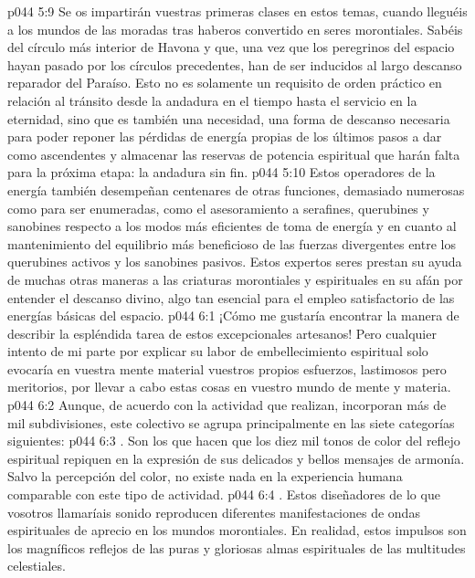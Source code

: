 \vs p044 5:9 Se os impartirán vuestras primeras clases en estos temas, cuando lleguéis a los mundos de las moradas tras haberos convertido en seres morontiales. Sabéis del círculo más interior de Havona y que, una vez que los peregrinos del espacio hayan pasado por los círculos precedentes, han de ser inducidos al largo descanso reparador del Paraíso. Esto no es solamente un requisito de orden práctico en relación al tránsito desde la andadura en el tiempo hasta el servicio en la eternidad, sino que es también una necesidad, una forma de descanso necesaria para poder reponer las pérdidas de energía propias de los últimos pasos a dar como ascendentes y almacenar las reservas de potencia espiritual que harán falta para la próxima etapa: la andadura sin fin.
\vs p044 5:10 Estos operadores de la energía también desempeñan centenares de otras funciones, demasiado numerosas como para ser enumeradas, como el asesoramiento a serafines, querubines y sanobines respecto a los modos más eficientes de toma de energía y en cuanto al mantenimiento del equilibrio más beneficioso de las fuerzas divergentes entre los querubines activos y los sanobines pasivos. Estos expertos seres prestan su ayuda de muchas otras maneras a las criaturas morontiales y espirituales en su afán por entender el descanso divino, algo tan esencial para el empleo satisfactorio de las energías básicas del espacio.
\vs p044 6:1 ¡Cómo me gustaría encontrar la manera de describir la espléndida tarea de estos excepcionales artesanos! Pero cualquier intento de mi parte por explicar su labor de embellecimiento espiritual solo evocaría en vuestra mente material vuestros propios esfuerzos, lastimosos pero meritorios, por llevar a cabo estas cosas en vuestro mundo de mente y materia.
\vs p044 6:2 Aunque, de acuerdo con la actividad que realizan, incorporan más de mil subdivisiones, este colectivo se agrupa principalmente en las siete categorías siguientes:
\vs p044 6:3 . Son los que hacen que los diez mil tonos de color del reflejo espiritual repiquen en la expresión de sus delicados y bellos mensajes de armonía. Salvo la percepción del color, no existe nada en la experiencia humana comparable con este tipo de actividad.
\vs p044 6:4 . Estos diseñadores de lo que vosotros llamaríais sonido reproducen diferentes manifestaciones de ondas espirituales de aprecio en los mundos morontiales. En realidad, estos impulsos son los magníficos reflejos de las puras y gloriosas almas espirituales de las multitudes celestiales.
